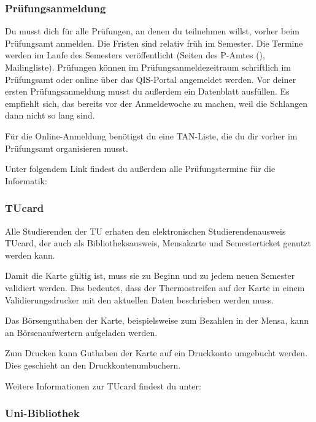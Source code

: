 \begin{multicols}{2}
\subsubsection{Prüfungsanmeldung}
	\label{todoanmeldung}

	Du musst dich für alle Prüfungen, an denen du teilnehmen willst, vorher beim Prüfungsamt anmelden. Die Fristen sind relativ früh im Semester. Die Termine werden im Laufe des Semesters veröffentlicht (Seiten des P-Amtes (), Mailingliste). Prüfungen können im Prüfungsanmeldezeitraum schriftlich im Prüfungsamt oder online über das QIS-Portal angemeldet werden.
	Vor deiner ersten Prüfungsanmeldung musst du außerdem ein Datenblatt ausfüllen. Es empfiehlt sich, das bereits vor der Anmeldewoche zu machen, weil die Schlangen dann nicht so lang sind.

	Für die Online-Anmeldung benötigst du eine TAN-Liste, die du dir vorher im Prüfungsamt organisieren musst.

	Unter folgendem Link findest du außerdem alle Prüfungstermine für die Informatik:

\subsubsection{TUcard}
	\label{tucard}
	
	Alle Studierenden der TU erhaten den elektronischen Studierendenausweis TUcard, der auch als Bibliotheksausweis, Mensakarte und Semesterticket genutzt werden kann.

	Damit die Karte gültig ist, muss sie zu Beginn und zu jedem neuen Semester validiert werden. Das bedeutet, dass der Thermostreifen auf der Karte in einem Validierungsdrucker mit den aktuellen Daten beschrieben werden muss.

	Das Börsenguthaben der Karte, beispielsweise zum Bezahlen in der Mensa, kann an Börsenaufwertern aufgeladen werden.

	Zum Drucken kann Guthaben der Karte auf ein Druckkonto umgebucht werden. Dies geschieht an den Druckkontenumbuchern.

	Weitere Informationen zur TUcard findest du unter: 

\subsubsection{Uni-Bibliothek}
	\label{todobib}


\end{multicols}
